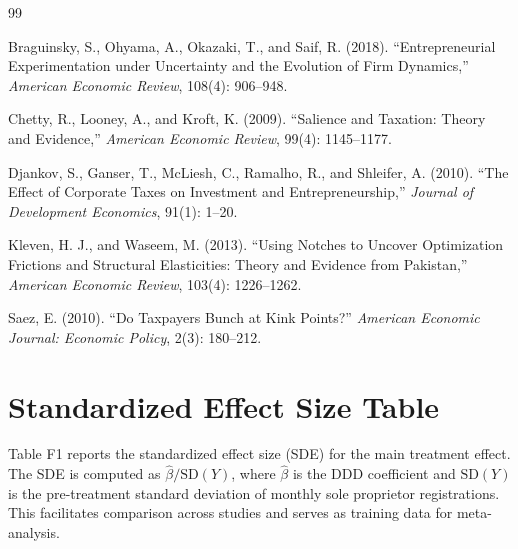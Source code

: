 \documentclass[12pt]{article}
\begin{document}
\label{apep_main_text_end}




\begin{thebibliography}{99}

 Braguinsky, S., Ohyama, A., Okazaki, T., and Saif, R. (2018). ``Entrepreneurial Experimentation under Uncertainty and the Evolution of Firm Dynamics,'' \emph{American Economic Review}, 108(4): 906--948.

 Chetty, R., Looney, A., and Kroft, K. (2009). ``Salience and Taxation: Theory and Evidence,'' \emph{American Economic Review}, 99(4): 1145--1177.

 Djankov, S., Ganser, T., McLiesh, C., Ramalho, R., and Shleifer, A. (2010). ``The Effect of Corporate Taxes on Investment and Entrepreneurship,'' \emph{Journal of Development Economics}, 91(1): 1--20.

 Kleven, H. J., and Waseem, M. (2013). ``Using Notches to Uncover Optimization Frictions and Structural Elasticities: Theory and Evidence from Pakistan,'' \emph{American Economic Review}, 103(4): 1226--1262.

 Saez, E. (2010). ``Do Taxpayers Bunch at Kink Points?'' \emph{American Economic Journal: Economic Policy}, 2(3): 180--212.

\end{thebibliography}

\newpage


\appendix

\section{Standardized Effect Size Table}

Table F1 reports the standardized effect size (SDE) for the main treatment effect. The SDE is computed as $\hat{\beta} / \text{SD}(Y)$, where $\hat{\beta}$ is the DDD coefficient and $\text{SD}(Y)$ is the pre-treatment standard deviation of monthly sole proprietor registrations. This facilitates comparison across studies and serves as training data for meta-analysis.
\end{document}
